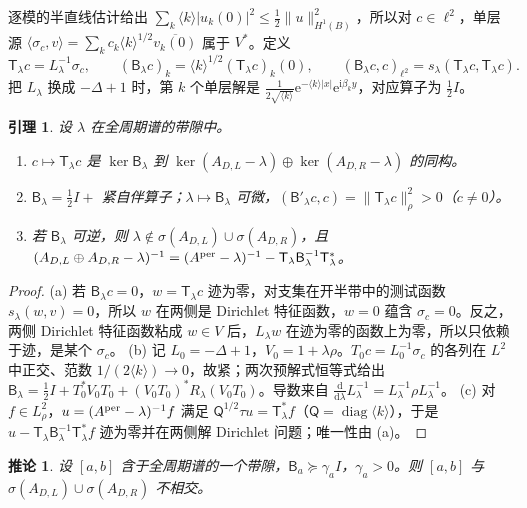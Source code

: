 \documentclass[11pt,a4paper,fontset=fandol]{ctexart}
\newcommand{\ii}{\mathrm{i}}
\newcommand{\ee}{\mathrm{e}}
\newcommand{\dd}{\mathrm{d}}
\theoremstyle{plain}
\newtheorem{lemma}[theorem]{引理}
\newtheorem{corollary}[theorem]{推论}
\theoremstyle{definition}
\theoremstyle{remark}
\begin{document}
逐模的半直线估计给出 $\sum_k\langle k\rangle|u_k(0)|^2\le\frac12\|u\|_{H^1(B)}^2$，所以对 $c\in\ell^2$，单层源 $\langle\sigma_c,v\rangle=\sum_kc_k\langle k\rangle^{1/2}\overline{v_k(0)}$ 属于 $V^*$。定义
\[
\mathsf T_\lambda c=L_\lambda^{-1}\sigma_c,\qquad(\mathsf B_\lambda c)_k=\langle k\rangle^{1/2}(\mathsf T_\lambda c)_k(0),\qquad(\mathsf B_\lambda c,c)_{\ell^2}=s_\lambda(\mathsf T_\lambda c,\mathsf T_\lambda c).
\]
把 $L_\lambda$ 换成 $-\Delta+1$ 时，第 $k$ 个单层解是 $\frac1{2\sqrt{\langle k\rangle}}\ee^{-\langle k\rangle|x|}\ee^{\ii\beta_ky}$，对应算子为 $\frac12I$。

\begin{lemma}
\label{lem:B}
设 $\lambda$ 在全周期谱的带隙中。
\begin{enumerate}[label=(\alph*)]
\item $c\mapsto\mathsf T_\lambda c$ 是 $\ker\mathsf B_\lambda$ 到 $\ker(A_{D,L}-\lambda)\oplus\ker(A_{D,R}-\lambda)$ 的同构。
\item $\mathsf B_\lambda=\frac12I+$ 紧自伴算子；$\lambda\mapsto\mathsf B_\lambda$ 可微，$(\mathsf B'_\lambda c,c)=\|\mathsf T_\lambda c\|_\rho^2>0$（$c\ne0$）。
\item 若 $\mathsf B_\lambda$ 可逆，则 $\lambda\notin\sigma(A_{D,L})\cup\sigma(A_{D,R})$，且 $(A_{D,L}\oplus A_{D,R}-\lambda)^{-1}=(A^{\rm per}-\lambda)^{-1}-\mathsf T_\lambda\mathsf B_\lambda^{-1}\mathsf T_\lambda^*$。
\end{enumerate}
\end{lemma}

\begin{proof}
(a) 若 $\mathsf B_\lambda c=0$，$w=\mathsf T_\lambda c$ 迹为零，对支集在开半带中的测试函数 $s_\lambda(w,v)=0$，所以 $w$ 在两侧是 Dirichlet 特征函数，$w=0$ 蕴含 $\sigma_c=0$。反之，两侧 Dirichlet 特征函数粘成 $w\in V$ 后，$L_\lambda w$ 在迹为零的函数上为零，所以只依赖于迹，是某个 $\sigma_c$。
(b) 记 $L_0=-\Delta+1$，$V_0=1+\lambda\rho$。$T_0c=L_0^{-1}\sigma_c$ 的各列在 $L^2$ 中正交、范数 $1/(2\langle k\rangle)\to0$，故紧；两次预解式恒等式给出 $\mathsf B_\lambda=\frac12I+T_0^*V_0T_0+(V_0T_0)^*R_\lambda(V_0T_0)$。导数来自 $\frac{\dd}{\dd\lambda}L_\lambda^{-1}=L_\lambda^{-1}\rho L_\lambda^{-1}$。
(c) 对 $f\in L^2_\rho$，$u=(A^{\rm per}-\lambda)^{-1}f$ 满足 $\mathsf Q^{1/2}\tau u=\mathsf T_\lambda^*f$（$\mathsf Q=\operatorname{diag}\langle k\rangle$），于是 $u-\mathsf T_\lambda\mathsf B_\lambda^{-1}\mathsf T_\lambda^*f$ 迹为零并在两侧解 Dirichlet 问题；唯一性由 (a)。
\end{proof}

\begin{corollary}
\label{cor:surface}
设 $[a,b]$ 含于全周期谱的一个带隙，$\mathsf B_a\succeq\gamma_aI$，$\gamma_a>0$。则 $[a,b]$ 与 $\sigma(A_{D,L})\cup\sigma(A_{D,R})$ 不相交。
\end{corollary}
\end{document}

